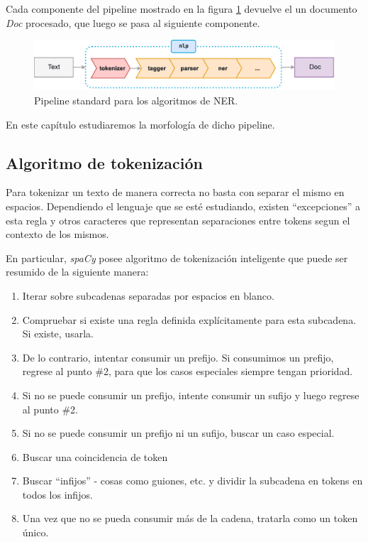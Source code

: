 \documentclass[12pt,a4paper,]{scrartcl}
\providecommand{\tightlist}{%
  \setlength{\itemsep}{0pt}\setlength{\parskip}{0pt}}
\begin{document}
Cada componente del pipeline mostrado en la figura \ref{fig:spacy-pipeline} devuelve el un documento \emph{Doc} procesado, que luego se pasa al siguiente componente.

\begin{figure}[H]

{\centering \includegraphics{assets/spacy_pipeline.pdf} 

}

\caption{Pipeline standard para los algoritmos de NER.}\label{fig:spacy-pipeline}
\end{figure}

En este capítulo estudiaremos la morfología de dicho pipeline.

\hypertarget{algoritmo-de-tokenizaciuxf3n}{%
\subsection{Algoritmo de tokenización}\label{algoritmo-de-tokenizaciuxf3n}}

Para tokenizar un texto de manera correcta no basta con separar el mismo en espacios. Dependiendo el lenguaje que se esté estudiando, existen \enquote{excepciones} a esta regla y otros caracteres que representan separaciones entre tokens segun el contexto de los mismos.

En particular, \emph{spaCy} posee algoritmo de tokenización inteligente que puede ser resumido de la siguiente manera:

\begin{enumerate}
\def\labelenumi{\arabic{enumi}.}
\tightlist
\item
  Iterar sobre subcadenas separadas por espacios en blanco.
\item
  Compruebar si existe una regla definida explícitamente para esta subcadena. Si existe, usarla.
\item
  De lo contrario, intentar consumir un prefijo. Si consumimos un prefijo, regrese al punto \#2, para que los casos especiales siempre tengan prioridad.
\item
  Si no se puede consumir un prefijo, intente consumir un sufijo y luego regrese al punto \#2.
\item
  Si no se puede consumir un prefijo ni un sufijo, buscar un caso especial.
\item
  Buscar una coincidencia de token
\item
  Buscar \enquote{infijos} - cosas como guiones, etc. y dividir la subcadena en tokens en todos los infijos.
\item
  Una vez que no se pueda consumir más de la cadena, tratarla como un token único.
\end{enumerate}
\end{document}
